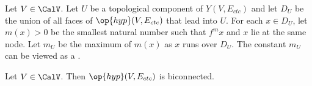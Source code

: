 \begin{definition}[$D_U$,~$m_U$]
  Let $V\in \CalV$.  Let $U$ be a topological component of
  $Y(V,E_{ctc})$ and let $D_U$ be the union of all faces of $\op{hyp}(V,E_{ctc})$
 that lead into
  $U$.   For each
  $x\in D_U$, let $m(x) >0$ be the smallest natural number such that
  $f^{m} x$ and $x$ lie at the same node.  Let $m_U$ be the maximum of
  $m(x)$  as $x$ runs over $D_U$.  The constant $m_U$ can be viewed as
  a .  %
\end{definition}

\begin{lemma}[biconnected]\label{lemma:biconnected}
  Let $V\in \CalV$.  Then $\op{hyp}(V,E_{ctc})$ is biconnected.
\end{lemma}

